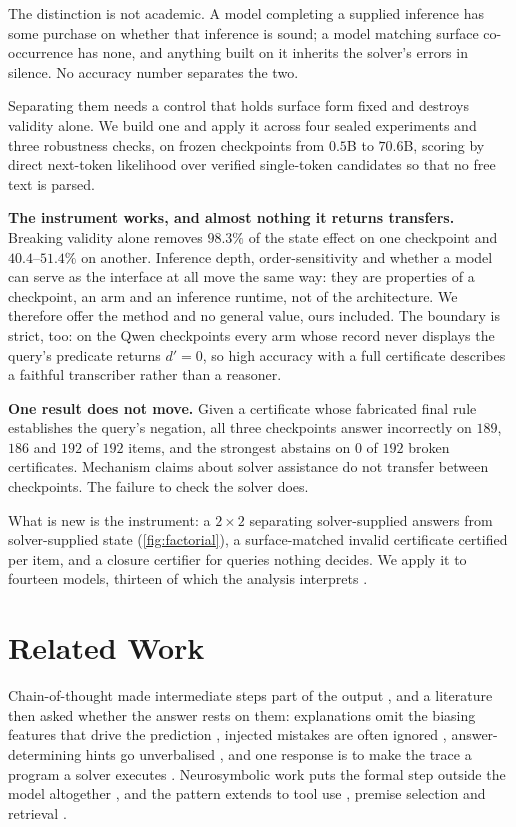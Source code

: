 \documentclass{article}
\begin{document}
The distinction is not academic. A model completing a supplied inference has
some purchase on whether that inference is sound; a model matching surface
co-occurrence has none, and anything built on it inherits the solver's errors in
silence. No accuracy number separates the two.

Separating them needs a control that holds surface form fixed and destroys
validity alone. We build one and apply it across four sealed experiments and three
robustness checks, on frozen checkpoints from $0.5$B to $70.6$B, scoring by
direct next-token likelihood over verified single-token candidates so that no
free text is parsed.

\textbf{The instrument works, and almost nothing it returns transfers.}
Breaking validity alone removes $98.3\%$ of the state effect on one checkpoint
and $40.4$--$51.4\%$ on another. Inference depth, order-sensitivity and whether
a model can serve as the interface at all move the same way: they are properties
of a checkpoint, an arm and an inference runtime, not of the architecture. We
therefore offer the method and no general value, ours included. The boundary is
strict, too: on the Qwen checkpoints every arm whose record never displays the
query's predicate returns $d' = 0$, so high accuracy with a full certificate
describes a faithful transcriber rather than a reasoner.

\textbf{One result does not move.} Given a certificate whose fabricated final
rule establishes the query's negation, all three checkpoints answer incorrectly
on $189$, $186$ and $192$ of $192$ items, and the strongest abstains on $0$ of
$192$ broken certificates.
Mechanism claims about solver assistance do not transfer between checkpoints.
The failure to check the solver does.

What is new is the instrument: a $2\times2$ separating solver-supplied answers
from solver-supplied state (\cref{fig:factorial}), a surface-matched invalid
certificate certified per item, and a closure certifier for queries nothing
decides. We apply it to fourteen models, thirteen of which the analysis interprets
\citep{team2024qwen,yang2025qwen3,grattafiori2024llama,team2025gemma,microsoft2025phi,team2024olmo,allal2025smollm}.

\section{Related Work}

Chain-of-thought made intermediate steps part of the output
\citep{wei2022chainofthought}, and a literature then asked whether the answer
rests on them: explanations omit the biasing features that drive the prediction
\citep{turpin2023language}, injected mistakes are often ignored
\citep{lanham2023measuring,arcuschin2025chainofthought}, answer-determining
hints go unverbalised \citep{chen2025reasoning}, and one response is to make the
trace a program a solver executes \citep{lyu2023faithful}. Neurosymbolic work
puts the formal step outside the model altogether
\citep{pan2023logiclm,olausson2023linc,ye2023satlm,gao2022pal}, and the pattern
extends to tool use \citep{schick2023toolformer}, premise selection
\citep{yang2023leandojo} and retrieval \citep{lewis2020retrievalaugmented}.
\end{document}
